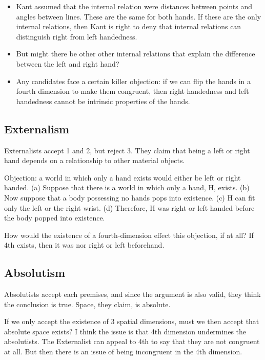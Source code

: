 \documentclass[oneside]{article}
\begin{document}
\begin{itemize}
\item
  Kant assumed that the internal relation were distances between points
  and angles between lines. These are the same for both hands. If these
  are the only internal relations, then Kant is right to deny that
  internal relations can distinguish right from left handedness.
\item
  But might there be other other internal relations that explain the
  difference between the left and right hand?
\item
  Any candidates face a certain killer objection: if we can flip the
  hands in a fourth dimension to make them congruent, then right
  handedness and left handedness cannot be intrinsic properties of the
  hands.
\end{itemize}

\subsection{Externalism}\label{externalism}

Externalists accept 1 and 2, but reject 3. They claim that being a left
or right hand depends on a relationship to other material objects.

Objection: a world in which only a hand exists would either be left or
right handed. (a) Suppose that there is a world in which only a hand, H,
exists. (b) Now suppose that a body possessing no hands pops into
existence. (c) H can fit only the left or the right wrist. (d)
Therefore, H was right or left handed before the body popped into
existence.

How would the existence of a fourth-dimension effect this objection, if
at all? If 4th exists, then it was nor right or left beforehand.

\subsection{Absolutism}\label{absolutism}

Absolutists accept each premises, and since the argument is also valid,
they think the conclusion is true. Space, they claim, is absolute.

If we only accept the existence of 3 spatial dimensions, must we then
accept that absolute space exists? I think the issue is that 4th
dimension undermines the absolutists. The Externalist can appeal to 4th
to say that they are not congruent at all. But then there is an issue of
being incongruent in the 4th dimension.
\end{document}
